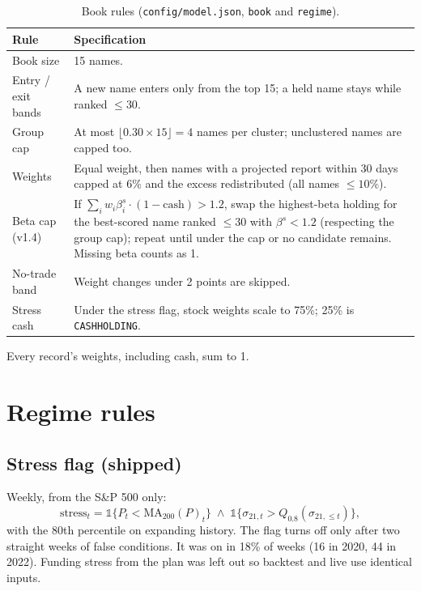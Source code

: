 \documentclass[11pt]{article}
\newcommand{\code}[1]{\texttt{#1}}
\begin{document}
\begin{table}[H]\centering\small
\begin{tabularx}{\textwidth}{lL}
\toprule
Rule & Specification \\
\midrule
Book size & 15 names. \\
Entry / exit bands & A new name enters only from the top 15; a held name stays while ranked $\le 30$. \\
Group cap & At most $\lfloor 0.30 \times 15\rfloor = 4$ names per cluster; unclustered names are capped too. \\
Weights & Equal weight, then names with a projected report within 30 days capped at 6\% and the excess
redistributed (all names $\le 10\%$). \\
Beta cap (v1.4) & If $\sum_i w_i \beta^{s}_i \cdot (1-\text{cash}) > 1.2$, swap the highest-beta holding for the
best-scored name ranked $\le 30$ with $\beta^{s} < 1.2$ (respecting the group cap); repeat until under the cap or no
candidate remains. Missing beta counts as 1. \\
No-trade band & Weight changes under 2 points are skipped. \\
Stress cash & Under the stress flag, stock weights scale to 75\%; 25\% is \code{CASHHOLDING}. \\
\bottomrule
\end{tabularx}
\caption{Book rules (\code{config/model.json}, \code{book} and \code{regime}).}
\end{table}

\noindent Every record's weights, including cash, sum to 1.

\section{Regime rules}

\subsection{Stress flag (shipped)}
Weekly, from the S\&P 500 only:
\[
\text{stress}_t = \mathbb{1}\{P_t < \text{MA}_{200}(P)_t\}\;\wedge\;\mathbb{1}\{\sigma_{21,t} > Q_{0.8}(\sigma_{21,\le t})\},
\]
with the 80th percentile on expanding history. The flag turns off only after two straight weeks of false conditions.
It was on in 18\% of weeks (16 in 2020, 44 in 2022). Funding stress from the plan was left out so backtest and live
use identical inputs.
\end{document}

